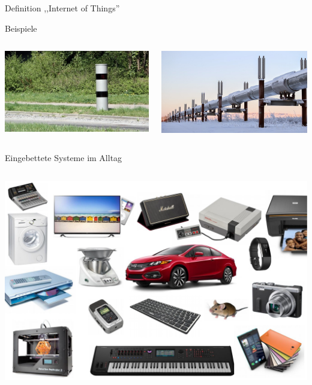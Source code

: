 {\begin{frame}{Definition ,,Internet of Things''}
\begin{block}{Beispiele}
\begin{columns}[onlytextwidth]
            \includegraphics[width=\textwidth]{img/blitzer_pulverhausstrasse}

            \includegraphics[width=\textwidth]{img/winter-681175_640}
        \end{columns}
    \end{block}
\end{frame}
}

\begin{frame}{Eingebettete Systeme im Alltag}
    \begin{columns}
        \column{\dimexpr\paperwidth-28pt}
        \includegraphics[width=\textwidth]{img/embedded_devices}
    \end{columns}
\end{frame}

